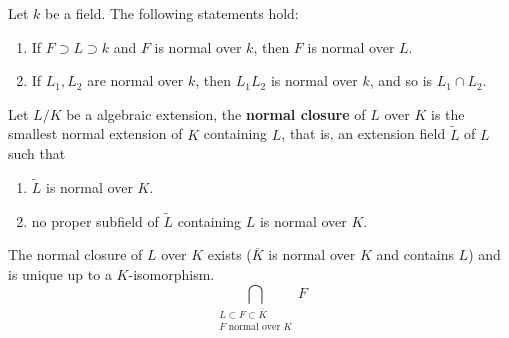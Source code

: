 \begin{proposition}
    Let $k$ be a field.
    The following statements hold:
    \begin{enumerate}
        \item
              If $F \supset L \supset k$ and $F$ is normal over $k$, then $F$ is normal over $L$.
        \item
              If $L_1, L_2$ are normal over $k$, then $L_1 L_2$ is normal over $k$, and so is $L_1 \cap L_2$.

    \end{enumerate}
\end{proposition}


\begin{definition}
    Let $L/K$ be a algebraic extension, the \textbf{normal closure} of $L$ over $K$ is the smallest normal extension of $K$ containing $L$, that is, an extension field $\tilde{L}$ of $L$ such that
    \begin{enumerate}[label=(\roman*)]
        \item  $\tilde{L}$ is normal over $K$.
        \item no proper subfield of $\tilde{L}$ containing $L$ is normal over $K$.
    \end{enumerate}
    \begin{remark}
        The normal closure of $L$ over $K$ exists ($\overline{K}$ is normal over $K$ and contains $L$) and is unique up to a $K$-isomorphism.
        \begin{equation*}
            \bigcap_{\substack{ L \subset F \subset \overline{K} \\ F \text { normal over } K}} F
        \end{equation*}
    \end{remark}
\end{definition}




